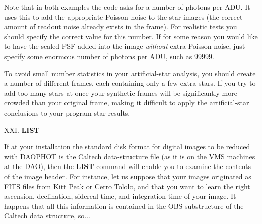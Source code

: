 Note that in both examples the code asks for a number of photons per
ADU.  It uses this to add the appropriate Poisson noise to the star
images (the correct amount of readout noise already exists in the
frame).  For realistic tests you should specify the correct value for
this number.  If for some reason you would like to have the scaled PSF
added into the image {\it without\/} extra Poisson noise, just specify
some enormous number of photons per ADU, such as 99999.

     To avoid small number statistics in your artificial-star analysis,
you should create a number of different frames, each containing only a
few extra stars.  If you try to add too many stars at once your
synthetic frames will be significantly more crowded than your original
frame, making it difficult to apply the artificial-star conclusions to
your program-star results.

\vfill
\eject
\noindent XXI.  {\bf LIST}

If at your installation the standard disk format for digital images to
be reduced with DAOPHOT is the Caltech data-structure file (as it is on
the VMS machines at the DAO), then the {\bf LIST} command will enable
you to examine the contents of the image header.  For instance, let us
suppose that your images originated as FITS files from Kitt Peak or
Cerro Tololo, and that you want to learn the right ascension,
declination, sidereal time, and integration time of your image.  It
happens that all this information is contained in the OBS substructure
of the Caltech data structure, so$\ldots$

